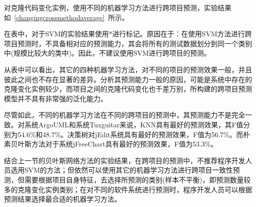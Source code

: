 
对克隆代码变化实例，使用不同的机器学习方法进行跨项目预测，实验结果如~\ref{changingcrossmethodaverage}~所示。

在表中，对于SVM的实验结果使用{*}进行标记。原因在于：在使用SVM方法进行跨项目预测时，不具备相对应的预测能力，其会将所有的测试数据划分到同一个类别中(规模比较大的类中)。因此，不建议使用SVM进行跨项目的预测。

从表中可以看出，其它的四种机器学习方法，对不同的项目的预测效果一般，并且彼此之间也不存在显著的差异。分析其预测能力一般的原因，可能是系统中存在的克隆变化实例较少，而项目之间的克隆代码变化也千差万别，所构建的跨项目预测模型并不具有非常强的泛化能力。

尽管如此，不同的机器学习方法在不同的跨项目的预测中，其预测能力不是完全一致。对系统ArgoUML和系统Tuxguitar来说，KNN具有最好的预测效果，其F值分别为54.6\%和48.7\%。决策树对jEdit系统具有最好的预测效果，F值为56.7\%。而朴素贝叶斯方法对于系统jFreeChart具有最好的预测效果，F值为53.3\%。

结合上一节的贝叶斯网络方法的实验结果，在跨项目的预测中，不推荐程序开发人员选用SVM的方法；但依然可以使用其它的机器学习方法进行跨项目一致性预测，但需要根据项目自身特征，去选择所预测的类别(样本不平衡)，即预测数量较多的克隆变化实例类别；在对不同的软件系统进行预测时，程序开发人员可以根据预测结果选择最合适的机器学习方法。

